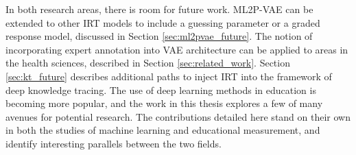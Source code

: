 In both research areas, there is room for future work. ML2P-VAE can be extended to other IRT models to include a guessing parameter or a graded response model, discussed in Section \ref{sec:ml2pvae_future}. The notion of incorporating expert annotation into VAE architecture can be applied to areas in the health sciences, described in Section \ref{sec:related_work}. Section \ref{sec:kt_future} describes additional paths to inject IRT into the framework of deep knowledge tracing. The use of deep learning methods in education is becoming more popular, and the work in this thesis explores a few of many avenues for potential research. The contributions detailed here stand on their own in both the studies of machine learning and educational measurement, and identify interesting parallels between the two fields.

